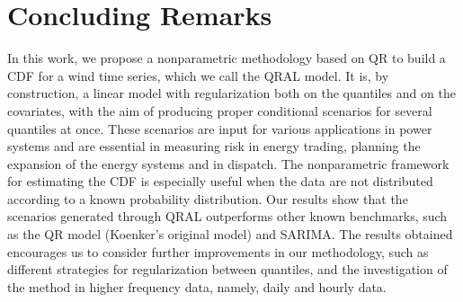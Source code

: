 \section{Concluding Remarks}

In this work, we propose a nonparametric methodology based on QR to build a CDF for a wind time series, which we call the QRAL model. It is, by construction, a linear model with regularization both on the quantiles and on the covariates, with the aim of producing proper conditional scenarios for several quantiles at once. These scenarios are input for various applications in power systems and are essential in measuring risk in energy trading, planning the expansion of the energy systems and in dispatch. The nonparametric framework for estimating the CDF is especially useful when the data are not distributed according to a known probability distribution. Our results show that the scenarios generated through QRAL outperforms other known benchmarks, such as the QR model (Koenker's original model) and SARIMA. 
The results obtained encourages us to consider further improvements in our methodology, such as different strategies for regularization between quantiles, and the investigation of the method in higher frequency data, namely, daily and hourly data.

